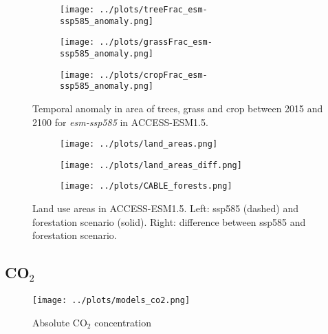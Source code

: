 \documentclass[]{article}
\begin{document}
\begin{figure}[H]
    \centering
    \begin{subfigure}[b]{0.4\linewidth}
        \texttt{[image: ../plots/treeFrac\_esm-ssp585\_anomaly.png]}
    \end{subfigure}
    \begin{subfigure}[b]{0.4\linewidth}
        \texttt{[image: ../plots/grassFrac\_esm-ssp585\_anomaly.png]}
    \end{subfigure}
    \begin{subfigure}[b]{0.4\linewidth}
        \texttt{[image: ../plots/cropFrac\_esm-ssp585\_anomaly.png]}
    \end{subfigure}
    \caption{Temporal anomaly in area of trees, grass and crop between 2015 and 2100 for \textit{esm-ssp585} in ACCESS-ESM1.5.
    }
    \label{fig:ACCESS_land_cover}
\end{figure}

\begin{figure}[H]
    \centering
    \begin{subfigure}[b]{0.45\linewidth}
        \texttt{[image: ../plots/land\_areas.png]}
    \end{subfigure}
    \begin{subfigure}[b]{0.45\linewidth}
        \texttt{[image: ../plots/land\_areas\_diff.png]}
    \end{subfigure}
    \begin{subfigure}[b]{0.45\linewidth}
        \texttt{[image: ../plots/CABLE\_forests.png]}
    \end{subfigure}
    \caption{Land use areas in ACCESS-ESM1.5. Left: ssp585 (dashed) and forestation scenario (solid). Right: difference between ssp585 and forestation scenario.}
    \label{fig:ACCESS_land_use}
\end{figure}

\subsection{CO$_2$}

\begin{figure}[H]
    \centering
    \texttt{[image: ../plots/models\_co2.png]}
    \caption{Absolute CO$_2$ concentration}
    \label{fig:models_co2_absolute}
\end{figure}
\end{document}
